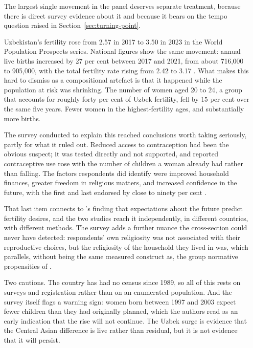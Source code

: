 The largest single movement in the panel deserves separate treatment, because there is direct survey evidence about it and because it bears on the tempo question raised in Section~\ref{sec:turning-point}.

Uzbekistan's fertility rose from 2.57 in 2017 to 3.50 in 2023 in the World Population Prospects series. National figures show the same movement: annual live births increased by 27 per cent between 2017 and 2021, from about 716{,}000 to 905{,}000, with the total fertility rate rising from 2.42 to 3.17 \parencite{unfpa2023}. What makes this hard to dismiss as a compositional artefact is that it happened while the population at risk was shrinking. The number of women aged 20 to 24, a group that accounts for roughly forty per cent of Uzbek fertility, fell by 15 per cent over the same five years. Fewer women in the highest-fertility ages, and substantially more births.

The survey conducted to explain this reached conclusions worth taking seriously, partly for what it ruled out. Reduced access to contraception had been the obvious suspect; it was tested directly and not supported, and reported contraceptive use rose with the number of children a woman already had rather than falling. The factors respondents did identify were improved household finances, greater freedom in religious matters, and increased confidence in the future, with the first and last endorsed by close to ninety per cent \parencite{unfpa2023}.

That last item connects to \textcite{agadjanian2022}'s finding that expectations about the future predict fertility desires, and the two studies reach it independently, in different countries, with different methods. The survey adds a further nuance the cross-section could never have detected: respondents' own religiosity was not associated with their reproductive choices, but the religiosity of the household they lived in was, which parallels, without being the same measured construct as, the group normative propensities of \textcite{agadjanian2022}.

Two cautions. The country has had no census since 1989, so all of this rests on surveys and registration rather than on an enumerated population. And the survey itself flags a warning sign: women born between 1997 and 2003 expect fewer children than they had originally planned, which the authors read as an early indication that the rise will not continue. The Uzbek surge is evidence that the Central Asian difference is live rather than residual, but it is not evidence that it will persist.

